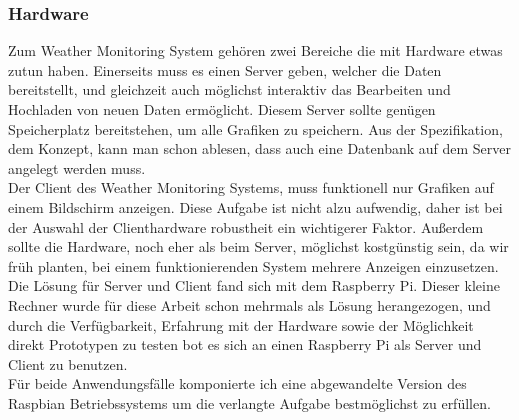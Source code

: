 \subsubsection{Hardware}
Zum Weather Monitoring System gehören zwei Bereiche die mit Hardware etwas zutun haben.
Einerseits muss es einen Server geben, welcher die Daten bereitstellt,
und gleichzeit auch möglichst interaktiv das Bearbeiten und Hochladen von neuen Daten ermöglicht.
Diesem Server sollte genügen Speicherplatz bereitstehen,
um alle Grafiken zu speichern.
Aus der Spezifikation, dem Konzept, kann man schon ablesen, dass auch eine Datenbank auf dem
Server angelegt werden muss.\\
Der Client des Weather Monitoring Systems, muss funktionell nur Grafiken auf einem Bildschirm anzeigen.
Diese Aufgabe ist nicht alzu aufwendig, daher ist bei der Auswahl der Clienthardware robustheit ein wichtigerer Faktor. Außerdem sollte die Hardware, noch eher als beim Server, möglichst kostgünstig sein,
da wir früh planten, bei einem funktionierenden System mehrere Anzeigen einzusetzen.
Die Lösung für Server und Client fand sich mit dem Raspberry Pi.
Dieser kleine Rechner wurde für diese Arbeit schon mehrmals als Lösung herangezogen,
und durch die Verfügbarkeit, Erfahrung mit der Hardware sowie der Möglichkeit direkt Prototypen zu testen bot es sich an einen Raspberry Pi als Server und Client zu benutzen.\\
Für beide Anwendungsfälle komponierte ich eine abgewandelte Version des Raspbian Betriebssystems um die verlangte Aufgabe bestmöglichst zu erfüllen.


